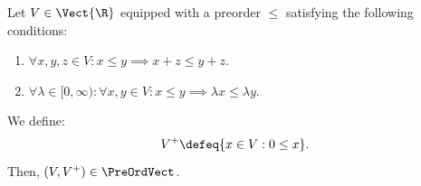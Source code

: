 %
%
\label {ex: every vector space with a compatible preorder is a preordered vector space}Let $V \in \Vect{\R}$ equipped with a preorder $\leq$ satisfying the following conditions:
\begin{enumerate}
    \item $\forall x,y,z \in V: x \leq y \implies x+z \leq y+z$.
    \item $\forall \lambda \in [0,\infty): \forall x,y \in V: x \leq y \implies \lambda x \leq \lambda y$.
\end{enumerate}
We define:
\[V^+ \defeq \{x \in V: 0 \leq x\}.\]
Then, $(V,V^+) \in \PreOrdVect$.
